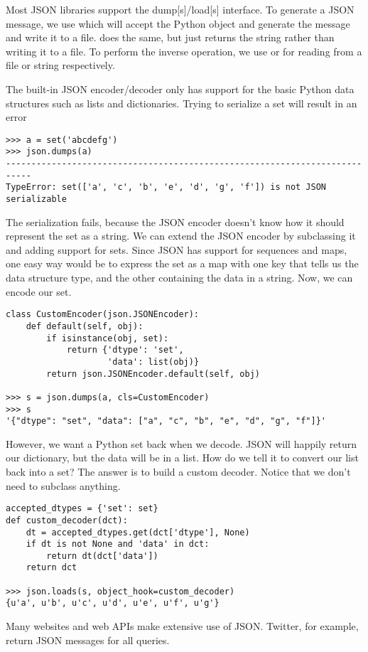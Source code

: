 Most JSON libraries support the dump[s]/load[s] interface.
To generate a JSON message, we use  which will accept the Python object and generate the message and write it to a file.
 does the same, but just returns the string rather than writing it to a file.
To perform the inverse operation, we use  or  for reading from a file or string respectively.

The built-in JSON encoder/decoder only has support for the basic Python data structures such as lists and dictionaries.
Trying to serialize a set will result in an error
\begin{lstlisting}
>>> a = set('abcdefg')
>>> json.dumps(a)
---------------------------------------------------------------------------
TypeError: set(['a', 'c', 'b', 'e', 'd', 'g', 'f']) is not JSON serializable
\end{lstlisting}
The serialization fails, because the JSON encoder doesn't know how it should represent the set as a string.
We can extend the JSON encoder by subclassing it and adding support for sets.
Since JSON has support for sequences and maps, one easy way would be to express the set as a map with one key that tells us the data structure type, and the other containing the data in a string.
Now, we can encode our set.
\begin{lstlisting}
class CustomEncoder(json.JSONEncoder):
    def default(self, obj):
        if isinstance(obj, set):
            return {'dtype': 'set',
                    'data': list(obj)}
        return json.JSONEncoder.default(self, obj)
        
>>> s = json.dumps(a, cls=CustomEncoder)
>>> s
'{"dtype": "set", "data": ["a", "c", "b", "e", "d", "g", "f"]}'
\end{lstlisting}
However, we want a Python set back when we decode.
JSON will happily return our dictionary, but the data will be in a list.
How do we tell it to convert our list back into a set?
The answer is to build a custom decoder.
Notice that we don't need to subclass anything.
\begin{lstlisting}
accepted_dtypes = {'set': set}
def custom_decoder(dct):
    dt = accepted_dtypes.get(dct['dtype'], None)
    if dt is not None and 'data' in dct:
        return dt(dct['data'])
    return dct

>>> json.loads(s, object_hook=custom_decoder)
{u'a', u'b', u'c', u'd', u'e', u'f', u'g'}
\end{lstlisting}

Many websites and web APIs make extensive use of JSON.
Twitter, for example, return JSON messages for all queries.


